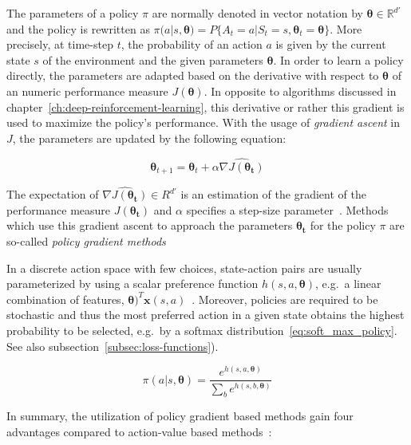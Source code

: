 \documentclass[draft,final]{vutinfth} %
\newcommand{\p}[1]{see p. #1}
\begin{document}
    The parameters of a policy $\pi$ are normally denoted in vector notation by $\boldsymbol{\theta} \in \mathbb{R}^{d'}$ and the policy is rewritten as $\pi(a|s,\boldsymbol{\theta})=P\{A_t=a|S_t=s,\boldsymbol{\theta}_t=\boldsymbol{\theta}\}$.
    More precisely, at time-step $t$, the probability of an action $a$ is given by the current state $s$ of the environment and the given parameters $\boldsymbol{\theta}$.
    In order to learn a policy directly, the parameters are adapted based on the derivative with respect to $\boldsymbol{\theta}$ of an numeric performance measure $J(\boldsymbol{\theta})$.
    In opposite to algorithms discussed in chapter~\ref{ch:deep-reinforcement-learning}, this derivative or rather this gradient is used to maximize the policy's performance.
    With the usage of \textit{gradient ascent} in $J$, the parameters are updated by the following equation:

    \begin{equation}
        \boldsymbol{\theta}_{t+1}=\boldsymbol{\theta}_{t} + \alpha \widehat{\nabla J(\boldsymbol{\theta_t})}\label{eq:parameter_update}
    \end{equation}

    The expectation of $\widehat{\nabla J(\boldsymbol{\theta_t})} \in R^{d'}$ is an estimation of the gradient of the performance measure $J(\boldsymbol{\theta_t})$ and $\alpha$ specifies a step-size parameter~.
    Methods which use this gradient ascent to approach the parameters $\boldsymbol{\theta_t}$ for the policy $\pi$ are so-called \textit{policy gradient methods}

    In a discrete action space with few choices, state-action pairs are usually parameterized by using a scalar preference function $h(s,a,\boldsymbol{\theta})$, e.g.\ a linear combination of features, $\boldsymbol{\theta})^T\boldsymbol{x}(s,a)$~.
    Moreover, policies are required to be stochastic and thus the most preferred action in a given state obtains the highest probability to be selected, e.g.\ by a softmax distribution~\eqref{eq:soft_max_policy}.
    See also subsection~\ref{subsec:loss-functions}).

    \begin{equation}
        \pi(a|s,\boldsymbol{\theta})=\frac{e^{h(s,a,\boldsymbol{\theta})}}{\sum_{b}e^{h(s,b,\boldsymbol{\theta})}}\label{eq:soft_max_policy}
    \end{equation}


    In summary, the utilization of policy gradient based methods gain four advantages compared to action-value based methods~\citep[\p{322f}]{sutton_reinforcement_2018}:
\end{document}
